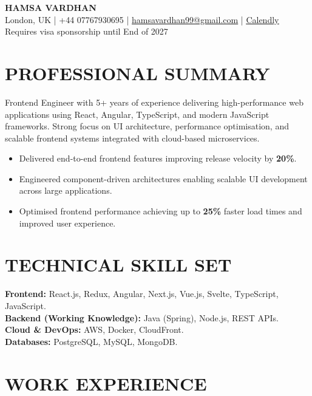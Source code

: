 \documentclass[11pt]{article}
\begin{document}
\begin{center}
{\LARGE \textbf{HAMSA VARDHAN}}\\
London, UK \;|\; +44 07767930695 \;|\;
\href{mailto:hamsavardhan99@gmail.com}{hamsavardhan99@gmail.com} \;|\; \href{https://calendly.com/hamsa-vd/intro-call}{\underline{Calendly}} \\
{\small Requires visa sponsorship until End of 2027}
\end{center}

\section*{PROFESSIONAL SUMMARY}

Frontend Engineer with 5+ years of experience delivering high-performance web applications using React, Angular, TypeScript, and modern JavaScript frameworks. Strong focus on UI architecture, performance optimisation, and scalable frontend systems integrated with cloud-based microservices.

\begin{itemize}
    \item Delivered end-to-end frontend features improving release velocity by \textbf{20\%}.
    \item Engineered component-driven architectures enabling scalable UI development across large applications.
    \item Optimised frontend performance achieving up to \textbf{25\%} faster load times and improved user experience.
\end{itemize}

\section*{TECHNICAL SKILL SET}

\textbf{Frontend:} React.js, Redux, Angular, Next.js, Vue.js, Svelte, TypeScript, JavaScript.\\
\textbf{Backend (Working Knowledge):} Java (Spring), Node.js, REST APIs.\\
\textbf{Cloud \& DevOps:} AWS, Docker, CloudFront.\\
\textbf{Databases:} PostgreSQL, MySQL, MongoDB.

\section*{WORK EXPERIENCE}
\end{document}

